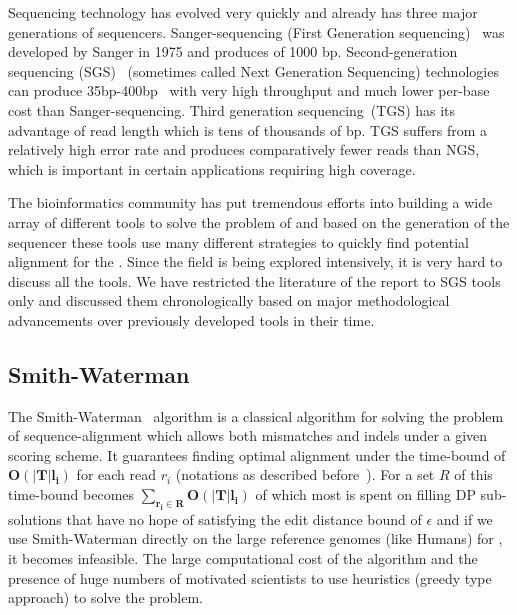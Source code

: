 \bigbreak

Sequencing technology has evolved very quickly and already has three major generations of sequencers. Sanger-sequencing (First Generation sequencing)~\citep{sanger1975rapid} was developed by Sanger in 1975 and produces \reads of 1000 bp. Second-generation sequencing (SGS)~\citep{reis2009next} (sometimes called Next Generation Sequencing) technologies can produce 35bp-400bp~\citep{schatz2010assembly} \reads with very high throughput and much lower per-base cost than Sanger-sequencing. Third generation sequencing~\citep{schadt2010window}(TGS) has its advantage of read length which is tens of thousands of bp. TGS suffers from a relatively high error rate and produces comparatively fewer reads than NGS, which is important in certain applications requiring high coverage. 

The bioinformatics community has put tremendous efforts into building a wide array of different tools to solve the problem of \ra and based on the generation of the sequencer these tools use many different strategies to quickly find potential alignment for the \reads. Since the field is being explored intensively, it is very hard to discuss all the tools. We have restricted the literature of the report to SGS tools only and discussed them chronologically based on major methodological advancements over previously developed tools in their time.

\subsection{Smith-Waterman~\citep{smith1981identification}}
The Smith-Waterman~\citep{smith1981identification} algorithm is a classical algorithm for solving the problem of sequence-alignment which allows both mismatches and indels under a given scoring scheme. It guarantees finding optimal alignment under the time-bound of $\bm{O(|T|l_i)}$ for each read $r_i$ (notations as described before~). For a set $R$ of \reads this time-bound becomes $\bm{\sum_{r_i \in R}O(|T|l_i)}$ of which most is spent on filling DP sub-solutions that have no hope of satisfying the edit distance bound of $\epsilon$ and if we use Smith-Waterman directly on the large reference genomes (like Humans) for \ra, it becomes infeasible. The large computational cost of the algorithm and the presence of huge numbers of \reads motivated scientists to use heuristics (greedy type approach) to solve the problem.

